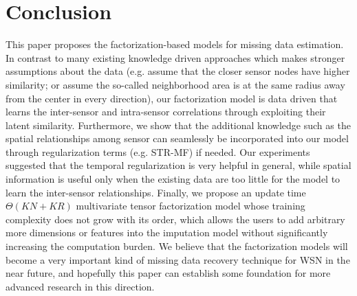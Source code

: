 \section{Conclusion}  \label{sec:conc}
This paper proposes the factorization-based models for missing data estimation. In contrast to many existing knowledge driven approaches which makes stronger assumptions about the data (e.g. assume that the closer sensor nodes have higher similarity; or assume the so-called neighborhood area is at the same radius away from the center in every direction), our factorization model is data driven that learns the inter-sensor and intra-sensor correlations through exploiting their latent similarity. Furthermore, we show that the additional knowledge such as the spatial relationships among sensor can seamlessly be incorporated into our model through regularization terms (e.g. STR-MF) if needed. Our experiments suggested that the temporal regularization is very helpful in general, while spatial information is useful only when the existing data are too little for the model to learn the inter-sensor relationships. Finally, we propose an update time $\Theta(KN + KR)$ multivariate tensor factorization model whose training complexity does not grow with its order, which allows the users to add arbitrary more dimensions or features into the imputation model without significantly increasing the computation burden.
We believe that the factorization models will become a very important kind of missing data recovery technique for WSN in the near future, and hopefully this paper can establish some foundation for more advanced research in this direction. 
